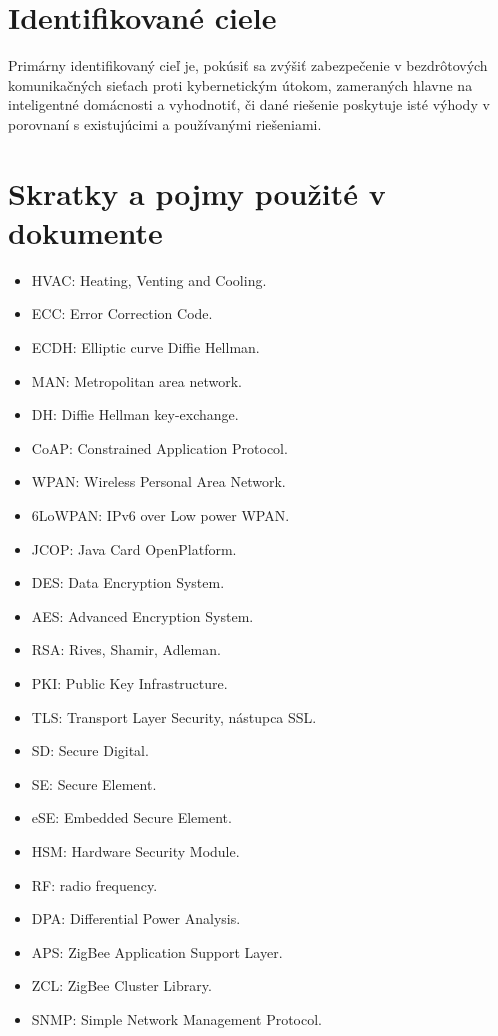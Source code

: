 \documentclass[12pt,a4paper,oneside,openright]{report}
\begin{document}
\section{Identifikované ciele}
Primárny identifikovaný cieľ je, pokúsiť sa zvýšiť zabezpečenie v bezdrôtových komunikačných sieťach proti kybernetickým útokom, zameraných hlavne na inteligentné domácnosti a vyhodnotiť, či dané riešenie poskytuje isté výhody v porovnaní s existujúcimi a používanými riešeniami.

\newpage
\singlespacing
\section{Skratky a pojmy použité v dokumente}
\begin{itemize}
	\item HVAC: Heating, Venting and Cooling.
	\item ECC: Error Correction Code.
	\item ECDH: Elliptic curve Diffie Hellman.
	\item MAN: Metropolitan area network.
	\item DH: Diffie Hellman key-exchange.
	\item CoAP: Constrained Application Protocol.
	\item WPAN: Wireless Personal Area Network.
	\item 6LoWPAN: IPv6 over Low power WPAN.
	\item JCOP: Java Card OpenPlatform.
	\item DES: Data Encryption System.
	\item AES: Advanced Encryption System.
	\item RSA: Rives, Shamir, Adleman.
	\item PKI: Public Key Infrastructure.
	\item TLS: Transport Layer Security, nástupca SSL.
	\item SD: Secure Digital.
	\item SE: Secure Element.
	\item eSE: Embedded Secure Element.
	\item HSM: Hardware Security Module.
	\item RF: radio frequency.
	\item DPA: Differential Power Analysis.
	\item APS: ZigBee Application Support Layer.
	\item ZCL: ZigBee Cluster Library.
	\item SNMP: Simple Network Management Protocol.

\end{itemize}
\end{document}
